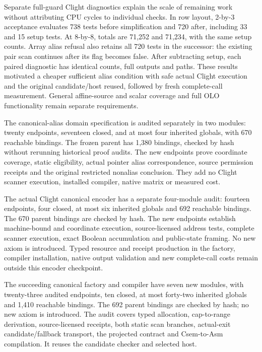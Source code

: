 Separate full-guard Clight diagnostics explain the scale of remaining work
without attributing CPU cycles to individual checks. In row layout, 2-by-3
acceptance evaluates 738 tests before simplification and 720 after, including
33 and 15 setup tests. At 8-by-8, totals are 71,252 and 71,234, with the same
setup counts. Array alias refusal also retains all 720 tests in the successor:
the existing pair scan continues after its flag becomes false. After subtracting
setup, each paired diagnostic has identical counts, full outputs and paths.
These results motivated a cheaper sufficient alias condition
with safe actual Clight execution and the original candidate/host reused,
followed by fresh complete-call measurement. General affine-source and scalar
coverage and full OLO functionality remain separate requirements.

The canonical-alias domain specification is audited separately in two modules:
twenty endpoints, seventeen closed, and at most four inherited globals, with
670 reachable bindings. The frozen parent has 1,380 bindings, checked by hash
without rerunning historical proof audits. The new endpoints prove coordinate
coverage, static eligibility, actual pointer alias correspondence, source
permission receipts and the original restricted nonalias conclusion. They add
no Clight scanner execution, installed compiler, native matrix or measured cost.

The actual Clight canonical encoder has a separate four-module audit: fourteen
endpoints, four closed, at most six inherited globals and 692 reachable bindings.
The 670 parent bindings are checked by hash. The new endpoints establish
machine-bound and coordinate execution, source-licensed address tests, complete
scanner execution, exact Boolean accumulation and public-state framing. No new
axiom is introduced. Typed resource and receipt production in the factory,
compiler installation, native output validation and new complete-call costs
remain outside this encoder checkpoint.

The succeeding canonical factory and compiler have seven new modules, with
twenty-three audited endpoints, ten closed, at most forty-two inherited globals
and 1,410 reachable bindings. The 692 parent bindings are checked by hash;
no new axiom is introduced. The audit covers typed allocation, cap-to-range
derivation, source-licensed receipts, both static scan branches, actual-exit
candidate/fallback transport, the projected contract and Csem-to-Asm compilation.
It reuses the candidate checker and selected host.

